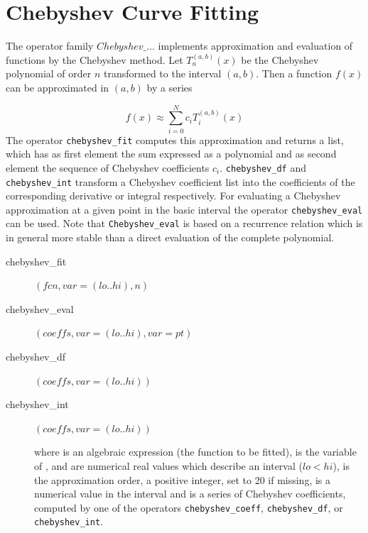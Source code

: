 \section{Chebyshev Curve Fitting}
\hypertarget{operator:CHEBYSHEV_FIT}{}
\hypertarget{operator:CHEBYSHEV_EVAL}{}
\hypertarget{operator:CHEBYSHEV_DF}{}
\hypertarget{operator:CHEBYSHEV_INT}{}

The operator family $Chebyshev\_\ldots$ implements approximation
and evaluation of functions by the Chebyshev method.
Let $T_n^{(a,b)}(x)$ be the Chebyshev polynomial of order $n$
transformed to the interval $(a,b)$. Then a function $f(x)$ can be
approximated in $(a,b)$ by a series

\[
 f(x) \approx \sum_{i=0}^N c_i T_i^{(a,b)}(x)
\]
The operator \texttt{chebyshev\_fit} computes this approximation and
returns a list, which has as first element the sum expressed
as a polynomial and as second element the sequence
of Chebyshev coefficients $c_{i}$.
\texttt{chebyshev\_df} and \texttt{chebyshev\_int} transform a Chebyshev
coefficient list into the coefficients of the corresponding
derivative or integral respectively. For evaluating a Chebyshev
approximation at a given point in the basic interval the
operator \texttt{chebyshev\_eval} can be used. Note that
\texttt{Chebyshev\_eval} is based on a recurrence relation which is
in general more stable than a direct evaluation of the
complete polynomial.

\begin{description}
\item[chebyshev\_fit] $(fcn,var=(lo .. hi),n)$

\item[chebyshev\_eval] $(coeffs,var=(lo .. hi),var=pt)$

\item[chebyshev\_df] $(coeffs,var=(lo .. hi))$

\item[chebyshev\_int] $(coeffs,var=(lo .. hi))$

where  is an algebraic expression (the function to be
fitted),  is the variable of ,  and  are
numerical real values which describe an interval ($lo < hi$),
 is the approximation order, a positive integer, set to 20 if missing,
 is a numerical value in the interval and  is
a series of Chebyshev coefficients, computed by one of the operators
\texttt{chebyshev\_coeff}, \texttt{chebyshev\_df}, or \texttt{chebyshev\_int}.
\end{description}

